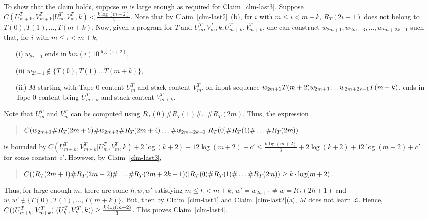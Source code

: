 \documentclass{LMCS}
\newcommand{\CalL}{{\mathcal L}}
\theoremstyle{plain}\newtheorem{athm}[thm]{Theorem}
\theoremstyle{plain}\newtheorem{aprop}[thm]{Proposition}
\theoremstyle{plain}\newtheorem{aprob}[thm]{Open Problem}
\theoremstyle{plain}\newtheorem{acor}[thm]{Corollary}
\theoremstyle{plain}\newtheorem{alem}[thm]{Lemma}
\theoremstyle{definition}\newtheorem{adefn}[thm]{Definition}
\theoremstyle{definition}\newtheorem{arem}[thm]{Remark}
\theoremstyle{plain}\newtheorem{aexmp}[thm]{Example}
\theoremstyle{plain}\newtheorem{aclm}[thm]{Claim}
\begin{document}
\noindent
To show that the claim holds, 
suppose $m$ is large enough as required for Claim~\ref{clm-last3}.
Suppose $C(U^T_{m+k},V^T_{m+k} | U^T_m,V^T_m,k) < \frac{k \log(m+2)}{3}$.
Note that by Claim~\ref{clm-last2}~(b), for $i$ with $m \leq i < m+k$,
$R_T(2i+1)$ does not belong to $T(0), T(1),\ldots, T(m+k)$.
Now, given a program for $T$ and $U^T_m,V^T_m,k,U^T_{m+k},V^T_{m+k}$,
one can construct $w_{2m+1},w_{2m+3},\ldots,w_{2m+2k-1}$ such that,
for $i$ with $m \leq i < m+k$,
\begin{enumerate}[(i)]
\item[(i)] $w_{2i+1}$ ends in $bin(i)10^{\log(i+2)}$,
\item[(ii)] $w_{2i+1} \notin \{T(0), T(1)\ldots T(m+k)\}$,
\item[(iii)] $M$ starting with Tape $0$ content $U^T_m$ and stack
content $V^T_m$, on
input sequence $w_{2m+1}T(m+2) \linebreak[3]
w_{2m+3}\ldots w_{2m+2k-1}T(m+k)$,
ends in  Tape $0$ content being $U^T_{m+k}$ and stack content $V^T_{m+k}$.
\end{enumerate}
Note that $U^T_m$ and $V^T_m$ can be computed using
$R_T(0)\# R_T(1)\# \ldots \#R_T(2m)$. Thus, the expression
\begin{quote}
$C(w_{2m+1}\linebreak[3]\#R_T(2m+2)\#w_{2m+3}\#R_T(2m+4)\ldots\#w_{2m+2k-1} |
\linebreak[3] R_T(0)\# \linebreak[3] R_T(1) \linebreak[3] \# \linebreak[3]
\ldots \linebreak[3] \#R_T(2m))$
\end{quote}
is bounded by
$C(U^T_{m+k},V^T_{m+k}|U^T_m,V^T_m,k)+2\log(k+2)+12\log(m+2)+c' 
\leq \frac{k \log(m+2)}{3}+2\log(k+2)+12\log(m+2)+c'$
for some constant $c'$.
However, by Claim~\ref{clm-last3}, 
\begin{quote}
  $C((R_T(2m+1)\#R_T(2m+2)\#\ldots\#R_T(2m+2k-1))|
  R_T(0)\#R_T(1)\#\ldots\linebreak[3] \#R_T(2m)) \geq k \cdot \log(m+2)$.
\end{quote}
Thus, for large enough $m$,
there are some $h,w,w'$ satisfying $m \leq h < m+k$,
$w' = w_{2h+1} \neq w = R_T(2h+1)$ and
$w,w' \notin \{T(0),T(1),\ldots,T(m+k)\}$. But, then
by Claim~\ref{clm-last1} and Claim~\ref{clm-last2}(a), 
$M$ does not learn $\CalL$.
Hence, $C((U^T_{m+k},V^T_{m+k})|(U^T_k,V^T_k,k)) \linebreak[3]
\geq \frac{k \cdot \log(m+2)}{3}$.
This proves Claim~\ref{clm-last4}.
\end{document}
